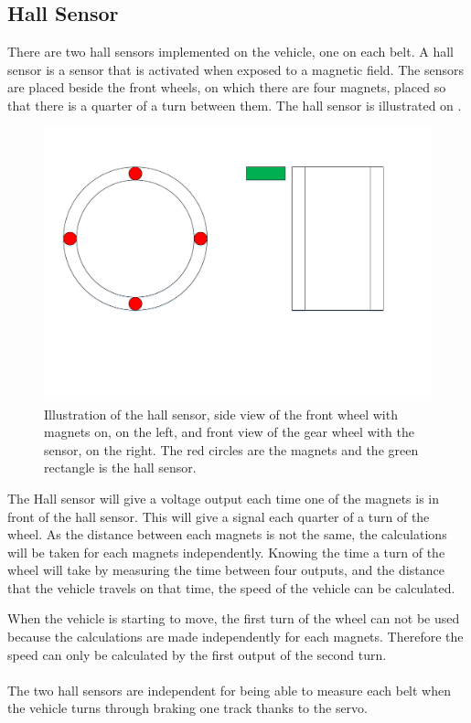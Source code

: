 \subsection{Hall Sensor}

There are two hall sensors implemented on the vehicle, one on each belt. A hall sensor is a sensor that is activated when exposed to a magnetic field. The sensors are placed beside the front wheels, on which there are four magnets, placed so that there is a quarter of a turn between them. The hall sensor is illustrated on .

 \begin{figure}[H]
	\centering
	\includegraphics[scale=0.5]{figures/HallSensorSide_Forward_view.pdf}
	\caption{Illustration of the hall sensor, side view of the front wheel with magnets on, on the left, and front view of the gear wheel with the sensor, on the right. The red circles are the magnets and the green rectangle is the hall sensor.}
	\label{HallSensor}
\end{figure}

The Hall sensor will give a voltage output each time one of the magnets is in front of the hall sensor. This will give a signal each quarter of a turn of the wheel. As the distance between each magnets is not the same, the calculations will be taken for each magnets independently.
Knowing the time a turn of the wheel will take by measuring the time between four outputs, and the distance that the vehicle travels on that time, the speed of the vehicle can be calculated.

When the vehicle is starting to move, the first turn of the wheel can not be used because the calculations are made independently for each magnets. Therefore the speed can only be calculated by the first output of the second turn.\\\\


The two hall sensors are independent for being able to measure each belt when the vehicle turns through braking one track thanks to the servo.